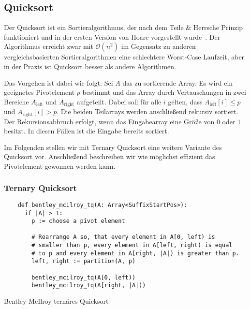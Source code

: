 \subsection{Quicksort}
\label{section:quicksort}

Der  Quicksort ist ein Sortieralgorithmus,
der nach dem Teile \& Herrsche Prinzip funktioniert und
in der ersten Version von Hoare vorgestellt wurde~\cite{quicksort}.
Der Algorithmus erreicht zwar mit $\mathcal O(n^2)$ im Gegensatz zu anderen
vergleichsbasierten Sortieralgorithmen eine schlechtere Worst-Case Laufzeit,
aber in der Praxis ist Quicksort besser als andere Algorithmen.

Das Vorgehen ist dabei wie folgt: Sei $A$ das zu sortierende Array.
Es wird ein geeignetes Pivotelement $p$ bestimmt und das Array durch Vertauschungen in
zwei Bereiche $A_{\text{left}}$ und $A_{\text{right}}$ aufgeteilt.
Dabei soll für alle $i$ gelten, dass $A_{\text{left}}[i] \le p$ und $A_{\text{right}}[i] > p$.
Die beiden Teilarrays werden anschließend rekursiv sortiert.
Der Rekursionsabbruch erfolgt, wenn das Eingabearray eine Größe von $0$ oder $1$ besitzt.
In diesen Fällen ist die Eingabe bereits sortiert.

Im Folgenden stellen wir mit Ternary Quicksort eine weitere Variante des Quicksort vor.
Anschließend beschreiben wir wie möglichst effizient das Pivotelement gewonnen werden kann.

\subsubsection{Ternary Quicksort}
\label{section:ternary_quicksort}

\begin{listing}[!t]
    \begin{verbatim}
    def bentley_mcilroy_tq(A: Array<SuffixStartPos>):
      if |A| > 1:
        p := choose a pivot element
    
        # Rearrange A so, that every element in A[0, left) is
        # smaller than p, every element in A[left, right) is equal
        # to p and every element in A[right, |A|) is greater than p.
        left, right := partition(A, p)
    
        bentley_mcilroy_tq(A[0, left))
        bentley_mcilroy_tq(A[right, |A|))
    \end{verbatim}
    \caption{Bentley-McIlroy ternäres Quicksort~\cite{ternary_quicksort}}
\end{listing}    

